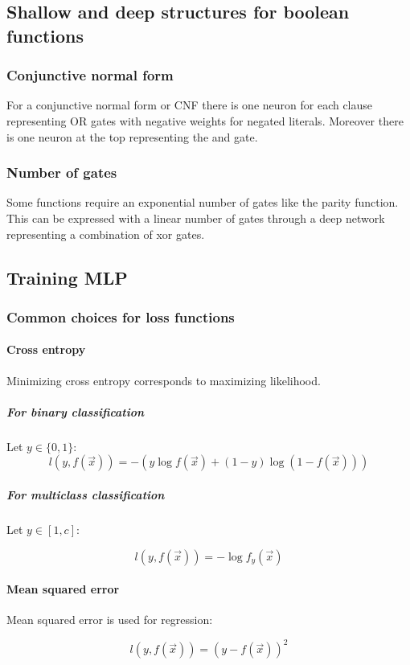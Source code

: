 	\subsection{Shallow and deep structures for boolean functions}

		\subsubsection{Conjunctive normal form}
		For a conjunctive normal form or CNF there is one neuron for each clause representing OR gates with negative weights for negated literals.
		Moreover there is one neuron at the top representing the and gate.

		\subsubsection{Number of gates}
		Some functions require an exponential number of gates like the parity function.
		This can be expressed with a linear number of gates through a deep network representing a combination of xor gates.

	\subsection{Training MLP}

		\subsubsection{Common choices for loss functions}

			\paragraph{Cross entropy}
			Minimizing cross entropy corresponds to maximizing likelihood.

				\subparagraph{For binary classification}
				Let $y\in\{0,1\}$:
				$$l(y, f(\vec{x})) = -(y\log f(\vec{x}) + (1-y)\log(1-f(\vec{x})))$$

				\subparagraph{For multiclass classification}
				Let $y\in[1,c]$:

				$$l(y,f(\vec{x})) = -\log f_y(\vec{x})$$

			\paragraph{Mean squared error}
			Mean squared error is used for regression:

			$$l(y,f(\vec{x})) = (y-f(\vec{x}))^2$$

